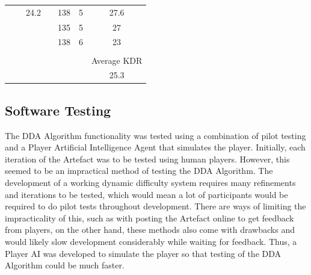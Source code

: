 \documentclass[journal]{IEEEtran}
\begin{document}
\begin{table}[]
\begin{tabular}{ccccccc}
                            & \multicolumn{1}{c|}{}       & \multicolumn{1}{c|}{24.2}        & \multicolumn{1}{c|}{} & \multicolumn{1}{c|}{138}   & \multicolumn{1}{c|}{5}      & \multicolumn{1}{c|}{27.6}        \\ \cline{3-3} \cline{5-7} 
                            &                             &                                  & \multicolumn{1}{c|}{} & \multicolumn{1}{c|}{135}   & \multicolumn{1}{c|}{5}      & \multicolumn{1}{c|}{27}          \\ \cline{5-7} 
                            &                             &                                  & \multicolumn{1}{c|}{} & \multicolumn{1}{c|}{138}   & \multicolumn{1}{c|}{6}      & \multicolumn{1}{c|}{23}          \\ \cline{5-7} 
\multicolumn{1}{l}{}        & \multicolumn{1}{l}{}        & \multicolumn{1}{l}{}             & \multicolumn{1}{l}{}  & \multicolumn{1}{l}{}       & \multicolumn{1}{l}{}        & \multicolumn{1}{l}{}             \\ \cline{7-7} 
\multicolumn{1}{l}{}        & \multicolumn{1}{l}{}        & \multicolumn{1}{l}{}             & \multicolumn{1}{l}{}  & \multicolumn{1}{l}{}       & \multicolumn{1}{l|}{}       & \multicolumn{1}{c|}{Average KDR} \\ \cline{7-7} 
\multicolumn{1}{l}{}        & \multicolumn{1}{l}{}        & \multicolumn{1}{l}{}             & \multicolumn{1}{l}{}  & \multicolumn{1}{l}{}       & \multicolumn{1}{l|}{}       & \multicolumn{1}{c|}{25.3}        \\ \cline{7-7} 
\end{tabular}
\end{table}

\subsection{Software Testing}

The DDA Algorithm functionality was tested using a combination of pilot testing and a Player Artificial Intelligence Agent that simulates the player. Initially, each iteration of the Artefact was to be tested using human players. However, this seemed to be an impractical method of testing the DDA Algorithm. The development of a working dynamic difficulty system requires many refinements and iterations to be tested, which would mean a lot of participants would be required to do pilot tests throughout development. There are ways of limiting the impracticality of this, such as with posting the Artefact online to get feedback from players, on the other hand, these methods also come with drawbacks and would likely slow development considerably while waiting for feedback. Thus, a Player AI was developed to simulate the player so that testing of the DDA Algorithm could be much faster. 
\end{document}
